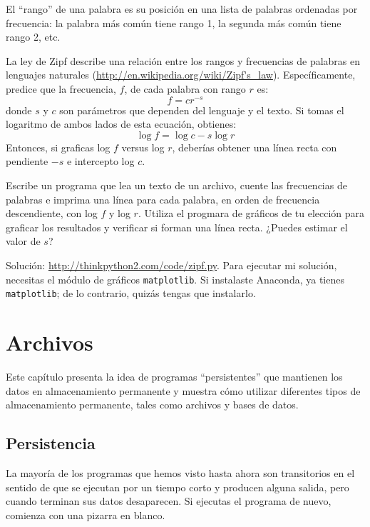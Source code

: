 \documentclass[10pt]{book}
\begin{document}
\begin{exercise}

El ``rango'' de una palabra es su posición en una lista de palabras
ordenadas por frecuencia: la palabra más común tiene rango 1, la
segunda más común tiene rango 2, etc.

La ley de Zipf describe una relación entre los rangos y frecuencias de
palabras en lenguajes naturales
(\url{http://en.wikipedia.org/wiki/Zipf's_law}).  Específicamente,
predice que la frecuencia, $f$, de cada palabra con rango $r$ es:
\[ f = c r^{-s} \]
%
donde $s$ y $c$ son parámetros que dependen del lenguaje y el
texto.  Si tomas el logaritmo de ambos lados de esta ecuación,
obtienes:
\[ \log f = \log c - s \log r \]
%
Entonces, si graficas log $f$ versus log $r$, deberías obtener
una línea recta con pendiente $-s$ e intercepto log $c$.

Escribe un programa que lea un texto de un archivo, cuente
las frecuencias de palabras e imprima una línea
para cada palabra, en orden de frecuencia descendiente, con
log $f$ y log $r$.  Utiliza el progmara de gráficos de tu
elección para graficar los resultados y verificar si forman
una línea recta.  ¿Puedes estimar el valor de $s$?

Solución: \url{http://thinkpython2.com/code/zipf.py}.
Para ejecutar mi solución, necesitas el módulo de gráficos {\tt matplotlib}.
Si instalaste Anaconda, ya tienes {\tt matplotlib};
de lo contrario, quizás tengas que instalarlo.

\end{exercise}



\chapter{Archivos}

Este capítulo presenta la idea de programas ``persistentes'' que
mantienen los datos en almacenamiento permanente y muestra cómo utilizar diferentes
tipos de almacenamiento permanente, tales como archivos y bases de datos.


\section{Persistencia}

La mayoría de los programas que hemos visto hasta ahora son transitorios en el
sentido de que se ejecutan por un tiempo corto y producen alguna salida,
pero cuando terminan sus datos desaparecen.  Si ejecutas el programa
de nuevo, comienza con una pizarra en blanco.
\end{document}
